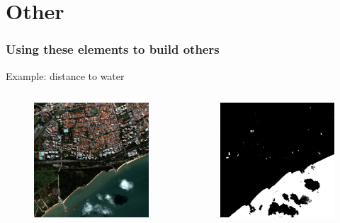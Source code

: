 \documentclass[compress]{beamer}
\begin{document}
\section{Other}


\begin{frame}
\frametitle{Using these elements to build others}
Example: distance to water
\begin{columns}
\begin{column}{0.32\textwidth}
\begin{figure}[]
  \includegraphics[width=1.0\textwidth]{radio2-extract-3b.jpg}
\end{figure}
\end{column}
\begin{column}{0.32\textwidth}
\begin{figure}[]
  \includegraphics[width=1.0\textwidth]{MNDWI2-threshold.jpg}

\end{figure}
\end{column}
\end{columns}
\end{frame}
\end{document}
